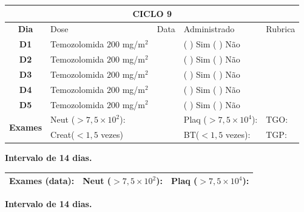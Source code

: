 \documentclass[11pt,a4paper,oldfontcommands]{memoir}
\begin{document}
\begin{center}
\begin{longtable}{p{1cm}p{4cm}|p{1cm}|p{4.6cm}|p{3cm}}
	\hline
	\multicolumn{5}{c}{\textbf{CICLO 9}}\\
\hline
    \multicolumn{1}{c|}{\multirow{1}{*}{\textbf{Dia}}}&{Dose}&{Data}&{Administrado}&{Rubrica} \\
    \hline
    \multicolumn{1}{c|}{\multirow{1}{*}{\textbf{D1}}}&{Temozolomida \(200\) mg/m\(^2\)}&&{(  ) Sim (  ) Não}&\\
    \multicolumn{1}{c|}{\multirow{1}{*}{\textbf{D2}}}&{Temozolomida \(200\) mg/m\(^2\)}&&{(  ) Sim (  ) Não}&\\
    \multicolumn{1}{c|}{\multirow{1}{*}{\textbf{D3}}}&{Temozolomida \(200\) mg/m\(^2\)}&&{(  ) Sim (  ) Não}&\\
    \multicolumn{1}{c|}{\multirow{1}{*}{\textbf{D4}}}&{Temozolomida \(200\) mg/m\(^2\)}&&{(  ) Sim (  ) Não}&\\
    \multicolumn{1}{c|}{\multirow{1}{*}{\textbf{D5}}}&{Temozolomida \(200\) mg/m\(^2\)}&&{(  ) Sim (  ) Não}&\\
    \hline
    \multicolumn{1}{c|}{\multirow{2}{*}{\textbf{Exames}}}&\multicolumn{2}{l|}{Neut (\(>7,5\times10^2\)):}&{Plaq (\(>7,5\times10^4\)):}&{TGO:}\\
    \cline{2-5}
    \multicolumn{1}{c|}{\multirow{2}{*}{{}}}&\multicolumn{2}{l|}{Creat(\(<1,5\) vezes)}&{BT(\(<1,5\) vezes):}&{TGP:}
    \\
    \hline
\end{longtable}
\textbf{Intervalo de 14 dias.}
\begin{longtable}{p{5cm}|p{5cm}|p{4.5cm}}
    \hline
    \textbf{Exames (data):}&{Neut (\(>7,5\times10^2\)):}&{Plaq (\(>7,5\times10^4\)):}
    \\
    \hline
\end{longtable}
\textbf{Intervalo de 14 dias.}
\end{center}
\clearpage
\end{document}
